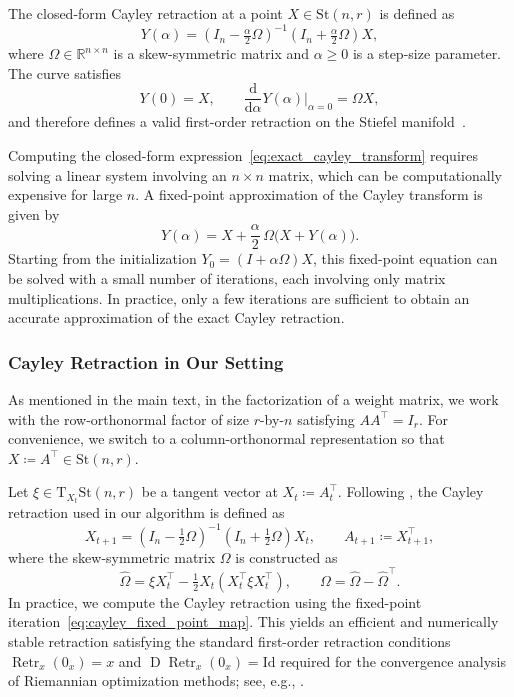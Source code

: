 \documentclass[11pt,a4paper]{article}
\numberwithin{equation}{section}
\let\Omega\varOmega
\newcommand{\tr}{^{\top}} %
\newcommand{\Stnr}{\mathrm{St}(n,r)}    %
\newcommand{\T}{\mathrm{T}}
\newcommand{\R}{\mathbb{R}}
\theoremstyle{plain}
\theoremstyle{definition}
\theoremstyle{remark}
\DeclareMathOperator{\Retraction}{Retr}
\DeclareMathOperator{\D}{D}   %
\begin{document}
The closed-form Cayley retraction at a point $ X \in \Stnr $ is defined as
\begin{equation}\label{eq:exact_cayley_transform}
   Y(\alpha) = \left( I_{n} - \tfrac{\alpha}{2} \Omega \right)^{-1}
     \left( I_{n} + \tfrac{\alpha}{2} \Omega \right) X,
\end{equation}
where $ \Omega \in \R^{n \times n} $ is a skew-symmetric matrix and $\alpha \ge 0$ is a step-size parameter.
The curve satisfies
\[
   Y(0) = X,  \qquad \frac{\mathrm{d}}{\mathrm{d}\alpha} Y(\alpha)\big|_{\alpha=0} = \Omega X,
\]
and therefore defines a valid first-order retraction on the Stiefel manifold~\citep{AMS:2008}.

Computing the closed-form expression~\eqref{eq:exact_cayley_transform} requires solving a linear system involving an $n \times n$ matrix, which can be computationally expensive for large $n$.
A fixed-point approximation of the Cayley transform is given by
\begin{equation} \label{eq:cayley_fixed_point_map}
   Y(\alpha) = X + \frac{\alpha}{2} \, \Omega \bigl( X + Y(\alpha) \bigr).
\end{equation}
Starting from the initialization $ Y_{0} = (I + \alpha \Omega) X $, this fixed-point equation can be solved with a small number of iterations, each involving only matrix multiplications.
In practice, only a few iterations are sufficient to obtain an accurate approximation of the exact Cayley retraction.


\subsubsection{Cayley Retraction in Our Setting}
As mentioned in the main text, in the factorization of a weight matrix, we work with the row-orthonormal factor of size $ r $-by-$ n $ satisfying $ A A\tr = I_{r} $. For convenience, we switch to a column-orthonormal representation so that $ X \coloneqq A\tr \in \Stnr $.

Let $ \xi \in \T_{X_{t}} \Stnr $ be a tangent vector at $ X_{t} \coloneqq A_{t}\tr $.
Following \citep[Eq.~(2)]{LFT:2020}, the Cayley retraction used in our algorithm is defined as
\[
    X_{t+1} = \left( I_n - \tfrac{1}{2} \Omega \right)^{-1} \left( I_n + \tfrac{1}{2} \Omega \right) X_{t}, \qquad  A_{t+1} \coloneqq X_{t+1}\tr,
\]
where the skew-symmetric matrix $\Omega$ is constructed as
\[
    \widehat{\Omega} = \xi X_{t}\tr - \tfrac{1}{2} X_{t} ( X_{t}\tr \xi X_{t}\tr),
    \qquad \Omega = \widehat{\Omega} - \widehat{\Omega}\tr.
\]
In practice, we compute the Cayley retraction using the fixed-point iteration~\eqref{eq:cayley_fixed_point_map}. %
This yields an efficient and numerically stable retraction satisfying the standard first-order retraction conditions $ \Retraction_{x}(0_{x}) = x $ and $ \D \! \Retraction_x({0}_{x}) = \mathrm{Id} $ required for the convergence analysis of Riemannian optimization methods; see, e.g., \citep[\S 4.1]{AMS:2008}.
\end{document}
